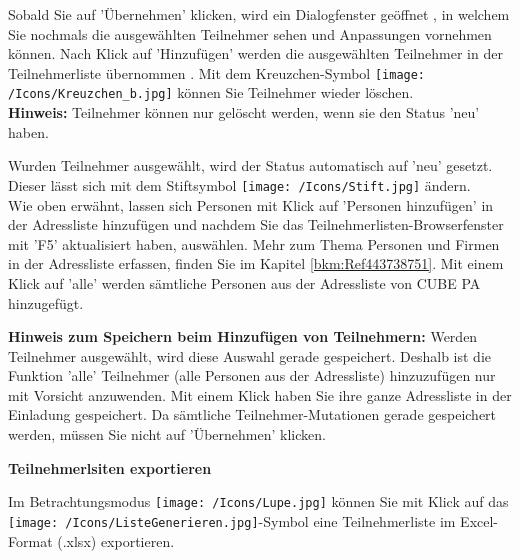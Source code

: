 Sobald Sie auf 'Übernehmen'  klicken, wird ein Dialogfenster geöffnet , in welchem Sie nochmals die ausgewählten Teilnehmer sehen und Anpassungen vornehmen können. Nach Klick auf 'Hinzufügen' werden die ausgewählten Teilnehmer in der Teilnehmerliste übernommen . Mit dem Kreuzchen-Symbol \texttt{[image: /Icons/Kreuzchen\_b.jpg]}  können Sie Teilnehmer wieder löschen. \\
\textbf{Hinweis:} Teilnehmer können nur gelöscht werden, wenn sie den Status 'neu' haben.

\vspace{\baselineskip}

Wurden Teilnehmer ausgewählt, wird der Status automatisch auf 'neu' gesetzt. Dieser lässt sich mit dem Stiftsymbol \texttt{[image: /Icons/Stift.jpg]} ändern.\\

Wie oben erwähnt, lassen sich Personen mit Klick auf 'Personen hinzufügen'  in der Adressliste hinzufügen und nachdem Sie das Teilnehmerlisten-Browserfenster mit 'F5' aktualisiert haben, auswählen. Mehr zum Thema Personen und Firmen in der Adressliste erfassen, finden Sie im Kapitel \ref{bkm:Ref443738751}.
Mit einem Klick auf 'alle'  werden sämtliche Personen aus der Adressliste von CUBE PA hinzugefügt. 

\vspace{\baselineskip}

\textbf{Hinweis zum Speichern beim Hinzufügen von Teilnehmern:} Werden Teilnehmer ausgewählt, wird diese Auswahl gerade gespeichert. Deshalb ist die Funktion 'alle' Teilnehmer  (alle Personen aus der Adressliste) hinzuzufügen nur mit Vorsicht anzuwenden. Mit einem Klick haben Sie ihre ganze Adressliste in der Einladung gespeichert. Da sämtliche Teilnehmer-Mutationen gerade gespeichert werden, müssen Sie nicht auf 'Übernehmen' klicken.

\vspace{\baselineskip}

\textbf{Teilnehmerlsiten exportieren}

Im Betrachtungsmodus \texttt{[image: /Icons/Lupe.jpg]} können Sie mit Klick auf das \texttt{[image: /Icons/ListeGenerieren.jpg]}-Symbol  eine Teilnehmerliste im Excel-Format (.xlsx) exportieren.

